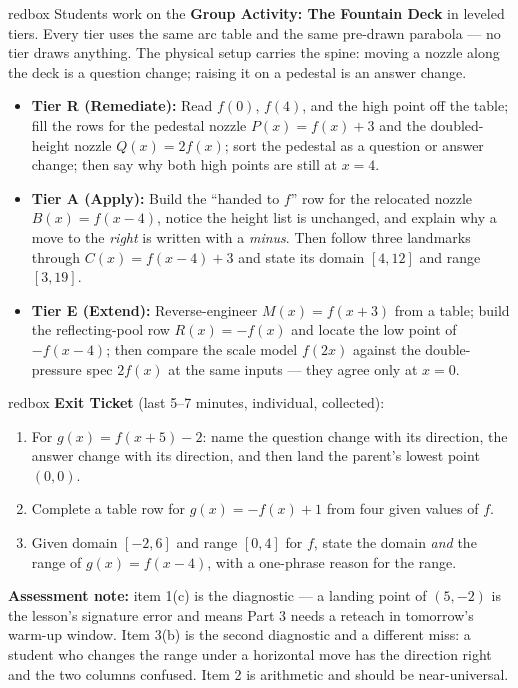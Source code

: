 \documentclass[10pt]{article}
\begin{document}
\begin{skillbox}{redbox}
Students work on the \textbf{Group Activity: The Fountain Deck} in leveled
tiers. Every tier uses the same arc table and the same pre-drawn parabola ---
no tier draws anything. The physical setup carries the spine: moving a nozzle
along the deck is a question change; raising it on a pedestal is an answer
change.

\begin{itemize}
  \item \textbf{Tier R (Remediate):} Read $f(0)$, $f(4)$, and the high point
        off the table; fill the rows for the pedestal nozzle $P(x)=f(x)+3$ and
        the doubled-height nozzle $Q(x)=2f(x)$; sort the pedestal as a
        question or answer change; then say why both high points are still at
        $x=4$.
  \item \textbf{Tier A (Apply):} Build the ``handed to $f$'' row for the
        relocated nozzle $B(x)=f(x-4)$, notice the height list is unchanged,
        and explain why a move to the \textit{right} is written with a
        \textit{minus}. Then follow three landmarks through
        $C(x)=f(x-4)+3$ and state its domain $[4,12]$ and range $[3,19]$.
  \item \textbf{Tier E (Extend):} Reverse-engineer $M(x)=f(x+3)$ from a table;
        build the reflecting-pool row $R(x)=-f(x)$ and locate the low point of
        $-f(x-4)$; then compare the scale model $f(2x)$ against the
        double-pressure spec $2f(x)$ at the same inputs --- they agree only at
        $x=0$.
\end{itemize}
\end{skillbox}

\begin{skillbox}{redbox}
\textbf{Exit Ticket} (last 5--7 minutes, individual, collected):
\begin{enumerate}
  \item For $g(x) = f(x+5)-2$: name the question change with its direction,
        the answer change with its direction, and then land the parent's
        lowest point $(0,0)$.
  \item Complete a table row for $g(x) = -f(x)+1$ from four given values of
        $f$.
  \item Given domain $[-2,6]$ and range $[0,4]$ for $f$, state the domain
        \textit{and} the range of $g(x) = f(x-4)$, with a one-phrase reason
        for the range.
\end{enumerate}
\textbf{Assessment note:} item 1(c) is the diagnostic --- a landing point of
$(5,-2)$ is the lesson's signature error and means Part 3 needs a reteach in
tomorrow's warm-up window. Item 3(b) is the second diagnostic and a different
miss: a student who changes the range under a horizontal move has the
direction right and the two columns confused. Item 2 is arithmetic and should
be near-universal.
\end{skillbox}
\end{document}
